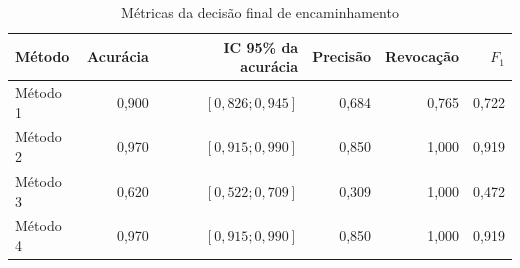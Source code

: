 \begin{table}[htbp]
\centering
\small
\caption{Métricas da decisão final de encaminhamento}
\label{tab:handoff_metricas}
\begin{tabular}{lrrrrr}
\hline
Método & Acurácia & IC 95\% da acurácia & Precisão & Revocação & $F_1$ \\
\hline
Método 1 & 0,900 & $[0,826; 0,945]$ & 0,684 & 0,765 & 0,722 \\
Método 2 & 0,970 & $[0,915; 0,990]$ & 0,850 & 1,000 & 0,919 \\
Método 3 & 0,620 & $[0,522; 0,709]$ & 0,309 & 1,000 & 0,472 \\
Método 4 & 0,970 & $[0,915; 0,990]$ & 0,850 & 1,000 & 0,919 \\
\hline
\end{tabular}
\end{table}
